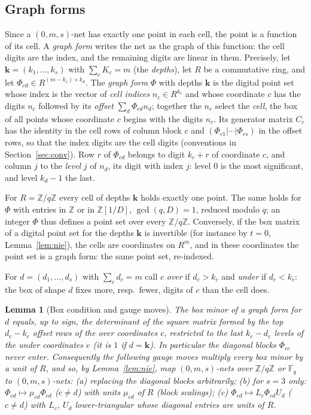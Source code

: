 \documentclass[11pt]{amsart}
\newtheorem{lemma}[theorem]{Lemma}
\theoremstyle{definition}
\theoremstyle{plain}
\newcommand{\Z}{\mathbb{Z}}
\newcommand{\F}{\mathbb{F}}
\begin{document}
\subsection{Graph forms} Since a $(0,m,s)$-net has exactly one point in each cell, the point is a function of its cell. A \emph{graph form} writes the net as the graph of this function: the cell digits are the index, and the remaining digits are linear in them. Precisely, let $\mathbf k=(k_1,\dots,k_s)$ with $\sum_cK_c=m$ (the \emph{depths}), let $R$ be a commutative ring, and let $\Phi_{cd}\in R^{(m-k_c)\times k_d}$. The \emph{graph form} $\Phi$ with depths $\mathbf k$ is the digital point set whose index is the vector of \emph{cell indices} $n_c\in R^{k_c}$ and whose coordinate $c$ has the digits $n_c$ followed by its \emph{offset} $\sum_d\Phi_{cd}n_d$; together the $n_c$ select the \emph{cell}, the box of all points whose coordinate $c$ begins with the digits $n_c$. Its generator matrix $C_c$ has the identity in the cell rows of column block $c$ and $(\Phi_{c1}|\cdots|\Phi_{cs})$ in the offset rows, so that the index digits are the cell digits (conventions in Section~\ref{sec:conv}). Row $r$ of $\Phi_{cd}$ belongs to digit $k_c+r$ of coordinate $c$, and column $j$ to the \emph{level} $j$ of $n_d$, its digit with index $j$: level $0$ is the most significant, and level $k_d-1$ the last.

For $R=\Z/q\Z$ every cell of depths $\mathbf k$ holds exactly one point. The same holds for $\Phi$ with entries in $\Z$ or in $\Z[1/D]$, $\gcd(q,D)=1$, reduced modulo $q$; an integer $\Phi$ thus defines a point set over every $\Z/q\Z$. Conversely, if the box matrix of a digital point set for the depths $\mathbf k$ is invertible (for instance by $t=0$, Lemma~\ref{lem:nie}), the cells are coordinates on $R^m$, and in these coordinates the point set is a graph form: the same point set, re-indexed.

For $d=(d_1,\dots,d_s)$ with $\sum_cd_c=m$ call $c$ \emph{over} if $d_c>k_c$ and \emph{under} if $d_c<k_c$: the box of shape $d$ fixes more, resp.\ fewer, digits of $c$ than the cell does.

\begin{lemma}[Box condition and gauge moves]\label{lem:box}\label{lem:gauge}
The box minor of a graph form for $d$ equals, up to sign, the determinant of the square matrix formed by the top $d_c-k_c$ offset rows of the over coordinates $c$, restricted to the last $k_e-d_e$ levels of the under coordinates $e$ (it is $1$ if $d=\mathbf k$). In particular the diagonal blocks $\Phi_{cc}$ never enter. Consequently the following \emph{gauge moves} multiply every box minor by a unit of $R$, and so, by Lemma~\ref{lem:nie}, map $(0,m,s)$-nets over $\Z/q\Z$ or $\F_q$ to $(0,m,s)$-nets: (a) replacing the diagonal blocks arbitrarily; (b) for $s=3$ only: $\Phi_{cd}\mapsto\mu_{cd}\Phi_{cd}$ ($c\ne d$) with units $\mu_{cd}$ of $R$ (\emph{block scalings}); (c) $\Phi_{cd}\mapsto L_c\Phi_{cd}U_d$ ($c\ne d$) with $L_c$, $U_d$ lower-triangular whose diagonal entries are units of $R$.
\end{lemma}
\end{document}
